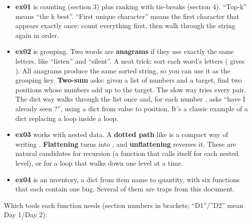 \documentclass[10pt,a4paper]{article}
\begin{document}
\begin{itemize}
\item \textbf{ex01} is counting (section 3) plus ranking with tie-breaks (section 4). “Top-k” means “the k best”. “First unique character” means the first character that appears exactly once: count everything first, then walk through the string again in order.
\item \textbf{ex02} is grouping. Two words are \textbf{anagrams} if they use exactly the same letters, like “listen” and “silent”. A neat trick: sort each word’s letters ( gives ). All anagrams produce the same sorted string, so you can use it as the grouping key. \textbf{Two-sum} asks: given a list of numbers and a target, find two positions whose numbers add up to the target. The slow way tries every pair. The dict way walks through the list once and, for each number , asks “have I already seen ?”, using a dict from value to position. It’s a classic example of a dict replacing a loop inside a loop.
\item \textbf{ex03} works with nested data. A \textbf{dotted path} like  is a compact way of writing . \textbf{Flattening} turns  into , and \textbf{unflattening} reverses it. These are natural candidates for recursion (a function that calls itself for each nested level), or for a loop that walks down one level at a time.
\item \textbf{ex04} is an inventory, a dict from item name to quantity, with six functions that each contain one bug. Several of them are traps from this document.
\end{itemize}
Which tools each function needs (section numbers in brackets; “D1”/”D2” mean Day 1/Day 2):
\end{document}
